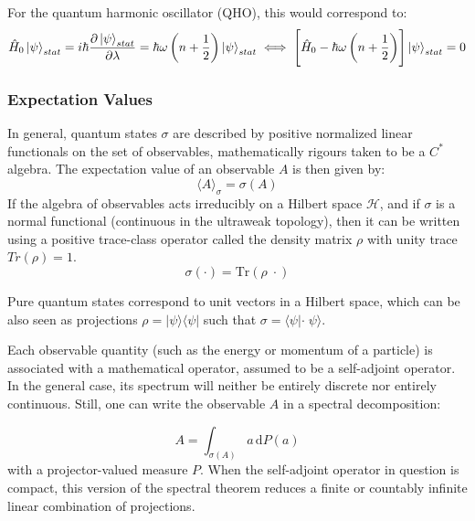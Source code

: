 \documentclass[a4paper,10pt]{article}
\numberwithin{equation}{section}
\begin{document}
For the quantum harmonic oscillator (QHO), this would correspond to:
\begin{equation}
    \hat{H}_0 \ket{\psi}_{stat}  = i\hbar \dfrac{\partial \ket{\psi}_{stat} }{\partial \lambda} = \hbar \omega \left( n + \frac{1}{2} \right) \ket{\psi}_{stat}   \iff \left[ \hat{H}_0 - \hbar \omega \left( n + \frac{1}{2} \right) \right] \ket{\psi}_{stat}  = 0  
\end{equation}
\fi 


\iffalse

\subsubsection{Expectation Values}
In general, quantum states $ \sigma$  are described by positive normalized linear functionals on the set of observables, mathematically rigours taken to be a $C^*$ algebra. The expectation value of an observable $A$ is then given by:
\begin{equation}
\langle A \rangle_\sigma = \sigma(A)
\end{equation}
If the algebra of observables acts irreducibly on a Hilbert space $\mathcal{H}$, and if $ \sigma$  is a normal functional (continuous in the ultraweak topology), then it can be written using a positive trace-class operator called the density matrix $\rho$  with unity trace $Tr(\rho) =1$.
\begin{equation}
    \sigma (\cdot) = \mathrm{Tr} (\rho \; \cdot)
\end{equation}


Pure quantum states correspond to unit vectors in a Hilbert space, which can be also seen as projections $\rho= |\psi\rangle\langle\psi|$ such that $\sigma = \langle \psi |\cdot \; \psi\rangle$.


Each observable quantity (such as the energy or momentum of a particle) is associated with a mathematical operator, assumed to be a self-adjoint operator. In the general case, its spectrum will neither be entirely discrete nor entirely continuous. Still, one can write the observable $A $ in a spectral decomposition:

\begin{equation}
    A = \int_{\sigma(A)} a \, \mathrm{d}P(a)
\end{equation}
with a projector-valued measure $P$. When the self-adjoint operator in question is compact, this version of the spectral theorem reduces a finite or countably infinite linear combination of projections.
\end{document}
